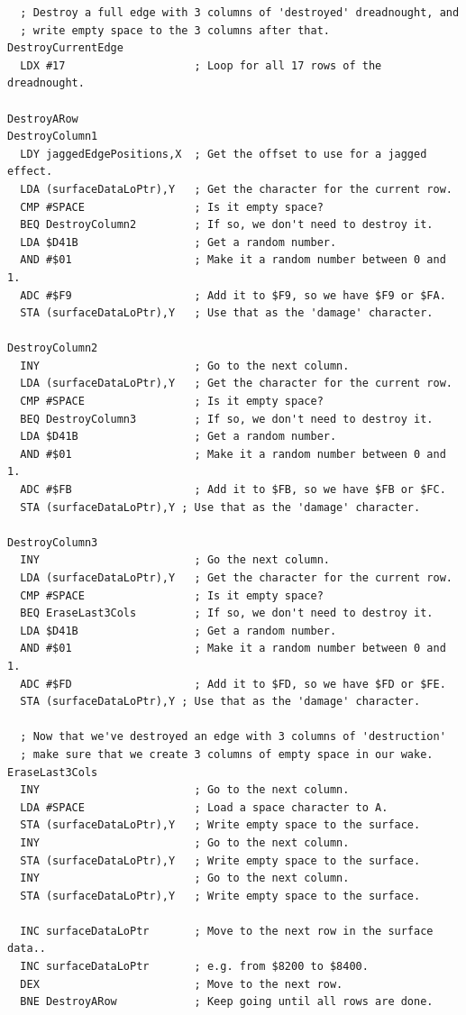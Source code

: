 \begin{lstlisting}
  ; Destroy a full edge with 3 columns of 'destroyed' dreadnought, and
  ; write empty space to the 3 columns after that.
DestroyCurrentEdge
  LDX #17                    ; Loop for all 17 rows of the dreadnought.

DestroyARow
DestroyColumn1  
  LDY jaggedEdgePositions,X  ; Get the offset to use for a jagged effect.
  LDA (surfaceDataLoPtr),Y   ; Get the character for the current row.
  CMP #SPACE                 ; Is it empty space?
  BEQ DestroyColumn2         ; If so, we don't need to destroy it.
  LDA $D41B                  ; Get a random number.
  AND #$01                   ; Make it a random number between 0 and 1.
  ADC #$F9                   ; Add it to $F9, so we have $F9 or $FA.
  STA (surfaceDataLoPtr),Y   ; Use that as the 'damage' character.

DestroyColumn2  
  INY                        ; Go to the next column.
  LDA (surfaceDataLoPtr),Y   ; Get the character for the current row.
  CMP #SPACE                 ; Is it empty space?
  BEQ DestroyColumn3         ; If so, we don't need to destroy it.
  LDA $D41B                  ; Get a random number.
  AND #$01                   ; Make it a random number between 0 and 1.
  ADC #$FB                   ; Add it to $FB, so we have $FB or $FC.
  STA (surfaceDataLoPtr),Y ; Use that as the 'damage' character. 

DestroyColumn3  
  INY                        ; Go the next column.
  LDA (surfaceDataLoPtr),Y   ; Get the character for the current row.
  CMP #SPACE                 ; Is it empty space?
  BEQ EraseLast3Cols         ; If so, we don't need to destroy it.
  LDA $D41B                  ; Get a random number.
  AND #$01                   ; Make it a random number between 0 and 1.
  ADC #$FD                   ; Add it to $FD, so we have $FD or $FE.
  STA (surfaceDataLoPtr),Y ; Use that as the 'damage' character. 

  ; Now that we've destroyed an edge with 3 columns of 'destruction'
  ; make sure that we create 3 columns of empty space in our wake.
EraseLast3Cols
  INY                        ; Go to the next column.
  LDA #SPACE                 ; Load a space character to A.
  STA (surfaceDataLoPtr),Y   ; Write empty space to the surface.
  INY                        ; Go to the next column.
  STA (surfaceDataLoPtr),Y   ; Write empty space to the surface.
  INY                        ; Go to the next column.
  STA (surfaceDataLoPtr),Y   ; Write empty space to the surface.

  INC surfaceDataLoPtr       ; Move to the next row in the surface data..
  INC surfaceDataLoPtr       ; e.g. from $8200 to $8400.
  DEX                        ; Move to the next row.
  BNE DestroyARow            ; Keep going until all rows are done.
\end{lstlisting}
